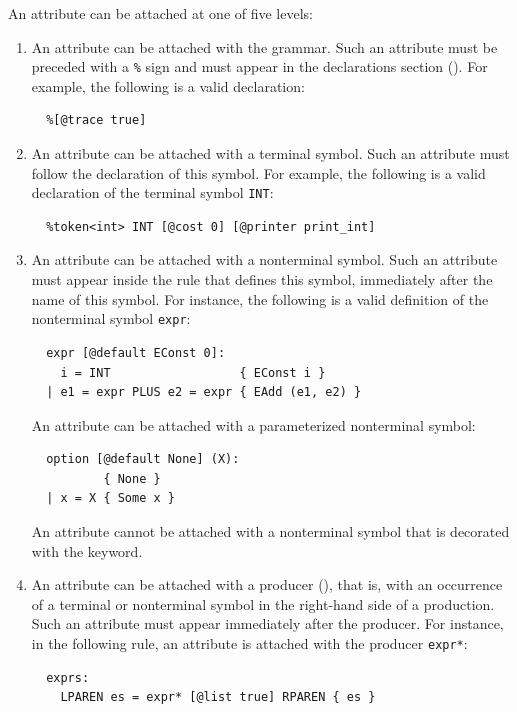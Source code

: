 \documentclass[onecolumn,11pt,nocopyrightspace,preprint]{sigplanconf}
\begin{document}
An attribute can be attached at one of five levels:
\begin{enumerate}

\item An attribute can be attached with the grammar.
  Such an attribute must be preceded with a \verb+%+ sign and must appear
  in the declarations section (). For example, the following
  is a valid declaration:
\begin{verbatim}
  %[@trace true]
\end{verbatim}

\item An attribute can be attached with a terminal symbol.
  Such an attribute must follow the declaration of this symbol.
  For example, the following is a valid declaration of the terminal symbol \verb+INT+:
\begin{verbatim}
  %token<int> INT [@cost 0] [@printer print_int]
\end{verbatim}

\item An attribute can be attached with a nonterminal symbol.
  Such an attribute must appear inside the rule that defines this symbol,
  immediately after the name of this symbol. For instance, the following is a valid
  definition of the nonterminal symbol \verb+expr+:
\begin{verbatim}
  expr [@default EConst 0]:
    i = INT                  { EConst i }
  | e1 = expr PLUS e2 = expr { EAdd (e1, e2) }
\end{verbatim}
  An attribute can be attached with a parameterized nonterminal symbol:
\begin{verbatim}
  option [@default None] (X):
          { None }
  | x = X { Some x }
\end{verbatim}
  An attribute cannot be attached with a nonterminal symbol that is
  decorated with the \dinline keyword.

\item An attribute can be attached with a producer (),
  that is, with an occurrence of a terminal or nonterminal symbol in the
  right-hand side of a production. Such an attribute must appear immediately
  after the producer. For instance, in the following rule,
  an attribute is attached with the producer \verb+expr*+:
\begin{verbatim}
  exprs:
    LPAREN es = expr* [@list true] RPAREN { es }
\end{verbatim}


\end{enumerate}
\end{document}
